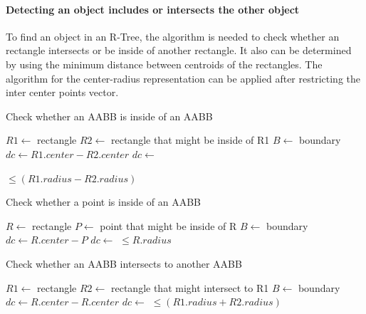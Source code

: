 \documentclass[10pt,letterpaper,twocolumn]{article}
\begin{document}
\paragraph{Detecting an object includes or intersects the other object}

To find an object in an R-Tree, the algorithm is needed to check whether an
rectangle intersects or be inside of another rectangle.
It also can be determined by using the minimum distance between centroids of the
rectangles.
The algorithm for the center-radius representation can be applied after
restricting the inter center points vector.

\begin{algorithm}[thb]
    \caption{Check whether an AABB is inside of an AABB}
    \begin{algorithmic}
        \State $R1 \gets$ rectangle
        \State $R2 \gets$ rectangle that might be inside of R1
        \State $B  \gets$ boundary
            \State $dc \gets R1.center - R2.center$
            \State $dc \gets$ 

            \State \Return {} $\leq (R1.radius - R2.radius)$
        \EndFunction
     \end{algorithmic}
\end{algorithm}

\begin{algorithm}[thb]
    \caption{Check whether a point is inside of an AABB}
    \begin{algorithmic}
        \State $R \gets$ rectangle
        \State $P \gets$ point that might be inside of R
        \State $B \gets$ boundary
            \State $dc \gets R.center - P$
            \State $dc \gets$ 
            \State \Return {} $\leq R.radius$
        \EndFunction
     \end{algorithmic}
\end{algorithm}

\begin{algorithm}[thb]
    \caption{Check whether an AABB intersects to another AABB}
    \begin{algorithmic}
        \State $R1 \gets$ rectangle
        \State $R2 \gets$ rectangle that might intersect to R1
        \State $B  \gets$ boundary
            \State $dc \gets R.center - R.center$
            \State $dc \gets$ 
            \State \Return {} $\leq (R1.radius + R2.radius)$
        \EndFunction
     \end{algorithmic}
\end{algorithm}
\end{document}
